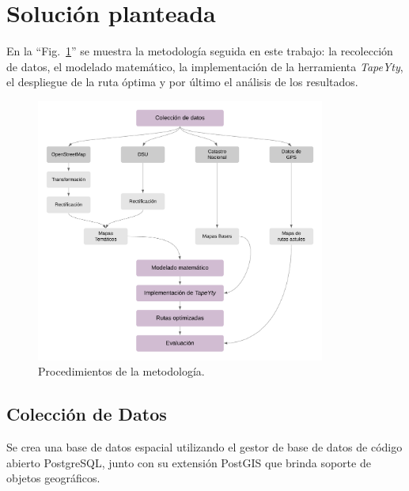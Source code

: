 \section{Solución planteada}

En la ``Fig.~\ref{fig:metodologia}'' se muestra la metodología seguida en este trabajo: la recolección de datos, el modelado matemático, la implementación de la herramienta \textit{TapeYty}, el despliegue de la ruta óptima y por último el análisis de los resultados.

\begin{figure}[tbp]
\centerline{\includegraphics[width=9.5cm]{DiagramaDeMetodologia.png}}
\caption{Procedimientos de la metodología.}
\label{fig:metodologia}
\end{figure}


\subsection{Colección de Datos}

Se crea una base de datos espacial utilizando el gestor de base de datos de código abierto PostgreSQL, junto con su extensión PostGIS que brinda soporte de objetos geográficos.

